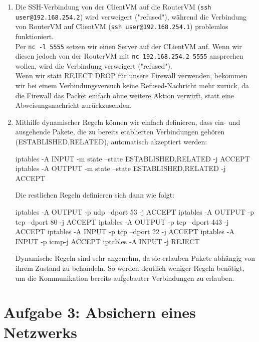 \documentclass[a4paper,10pt]{scrartcl}
\begin{document}
\begin{enumerate}[\bfseries 1.]
	\item
	      Die SSH-Verbindung von der ClientVM auf die RouterVM
	      (\texttt{ssh user@192.168.254.2}) wird verweigert ("refused"),
	      während die Verbindung von RouterVM auf ClientVM
	      (\texttt{ssh user@192.168.254.1}) problemlos funktioniert.\\
	      Per \texttt{nc -l 5555} setzen wir einen Server auf der CLientVM
	      auf. Wenn wir diesen jedoch von der RouterVM mit
	      \texttt{nc 192.168.254.2 5555} ansprechen wollen, wird die
	      Verbindung verweigert ("refused").\\
	      Wenn wir statt REJECT DROP für unsere Firewall verwenden,
	      bekommen wir bei einem Verbindungsversuch keine Refused-Nachricht
	      mehr zurück, da die Firewall das Packet einfach ohne weitere Aktion
          verwirft, statt eine Abweisungsnachricht zurückzusenden.

	\item Mithilfe dynamischer Regeln können wir einfach definieren, dass ein- und
	      ausgehende Pakete, die zu bereits etablierten Verbindungen gehören
	      (ESTABLISHED,RELATED), automatisch akzeptiert werden:
	      \begin{rootcommands}
iptables -A INPUT -m state --state ESTABLISHED,RELATED -j ACCEPT
iptables -A OUTPUT -m state --state ESTABLISHED,RELATED -j ACCEPT
	      \end{rootcommands}
	      Die restlichen Regeln definieren sich dann wie folgt:
	      \begin{rootcommands}[]
iptables -A OUTPUT -p udp --dport 53 -j ACCEPT
iptables -A OUTPUT -p tcp --dport 80 -j ACCEPT
iptables -A OUTPUT -p tcp --dport 443 -j ACCEPT
iptables -A INPUT -p tcp --dport 22 -j ACCEPT
iptables -A INPUT -p icmp-j ACCEPT
iptables -A INPUT -j REJECT
	      \end{rootcommands}
	      Dynamische Regeln sind sehr angenehm, da sie erlauben Pakete abhängig
	      von ihrem Zustand zu behandeln. So werden deutlich weniger Regeln benötigt,
	      um die Kommunikation bereits aufgebauter Verbindungen zu erlauben.
\end{enumerate}

\section*{Aufgabe 3: Absichern eines Netzwerks}
\label{sec:Absichern eines Netzwerks}
\end{document}
